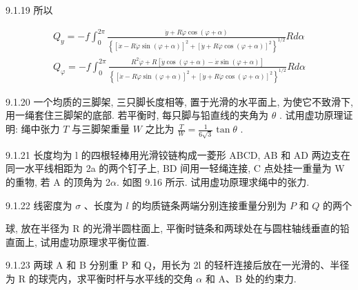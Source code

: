 \begin{problem}{9.1.19}
所以

\[
\begin{array}{l} Q _ {y} = - f \int_ {0} ^ {2 \pi} \frac {\dot {y} + R \dot {\varphi} \cos (\varphi + \alpha)}{\left\{\left[ \dot {x} - R \dot {\varphi} \sin (\varphi + \alpha) \right] ^ {2} + \left[ \dot {y} + R \dot {\varphi} \cos (\varphi + \alpha) \right] ^ {2} \right\} ^ {1 / 2}} R d \alpha \\ Q _ {\varphi} = - f \int_ {0} ^ {2 \pi} \frac {R ^ {2} \dot {\varphi} + R [ \dot {y} \cos (\varphi + \alpha) - \dot {x} \sin (\varphi + \alpha) ]}{\left\{\left[ \dot {x} - R \dot {\varphi} \sin (\varphi + \alpha) \right] ^ {2} + \left[ \dot {y} + R \dot {\varphi} \cos (\varphi + \alpha) \right] ^ {2} \right\} ^ {1 / 2}} R d \alpha \end{array}
\]
\begin{center}

\end{center}
\end{problem}
\clearpage


\begin{problem}{9.1.20}
一个均质的三脚架, 三只脚长度相等, 置于光滑的水平面上, 为使它不致滑下, 用一绳套住三脚架的底部. 若平衡时, 每只脚与铅直线的夹角为 $\theta$ . 试用虚功原理证明: 绳中张力 $T$ 与三脚架重量 $W$ 之比为 $\frac{T}{W} = \frac{1}{6\sqrt{3}}\tan \theta$ .
\begin{center}

\end{center}
\end{problem}
\clearpage


\begin{problem}{9.1.21}
长度均为 l 的四根轻棒用光滑铰链构成一菱形 ABCD, AB 和 AD 两边支在同一水平线相距为 2a 的两个钉子上, BD 间用一轻绳连接, C 点处挂一重量为 W 的重物, 若 A 的顶角为 2$\alpha$. 如图 9.16 所示. 试用虚功原理求绳中的张力.
\begin{center}

\end{center}
\end{problem}
\clearpage


\begin{problem}{9.1.22}
线密度为 $\sigma$ 、长度为 $l$ 的均质链条两端分别连接重量分别为 $P$ 和 $Q$ 的两个

球, 放在半径为 R 的光滑半圆柱面上, 平衡时链条和两球处在与圆柱轴线垂直的铅直面上, 试用虚功原理求平衡位置.
\end{problem}
\clearpage


\begin{problem}{9.1.23}
两球 A 和 B 分别重 P 和 Q，用长为 2l 的轻杆连接后放在一光滑的、半径为 R 的球壳内，求平衡时杆与水平线的交角 $\alpha$ 和 A、B 处的约束力.
\begin{center}

\end{center}
\end{problem}
\clearpage


